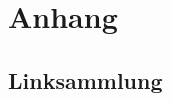 \documentclass{fontdoku}
\begin{document}
%
%
%
%
%
%
%
%
%
%
%
%


\newpage
\section{Anhang}
\subsection{Linksammlung}
\end{document}
